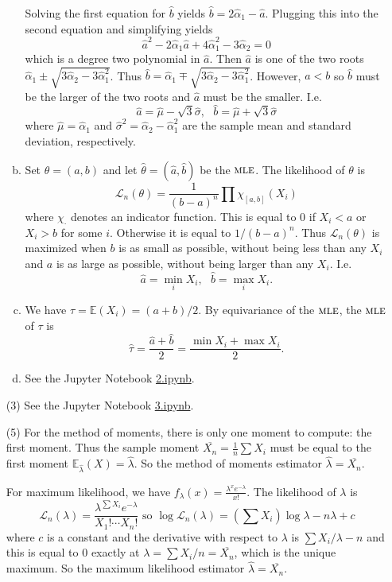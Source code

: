 \documentclass[10pt]{article}
\newcommand{\E}{\mathbb{E}}
\newcommand{\MLE}{\textsc{mle}}
\begin{document}
\begin{enumerate}
\begin{enumerate}[(a)]
Solving the first equation for $\hat b$ yields $\hat b = 2\hat \alpha_1 - \hat a$.
Plugging this into the second equation and simplifying yields
\[
\hat a^2 - 2\hat \alpha_1 \hat a + 4\hat \alpha_1^2 - 3\hat \alpha_2 = 0
\]
which is a degree two polynomial in $\hat a$. Then $\hat a$ is one of the two roots
$\hat \alpha_1 \pm \sqrt{3\hat \alpha_2 - 3 \hat \alpha_1^2}$. Thus
$\hat b = \hat \alpha_1 \mp \sqrt{3\hat \alpha_2 - 3 \hat \alpha_1^2}$. However,
$a<b$ so $\hat b$ must be the larger of the two roots and $\hat a$ must be
the smaller. I.e.
\[
\hat a = \hat \mu - \sqrt{3}\hat \sigma, \ \ \
\hat b = \hat \mu + \sqrt{3}\hat \sigma
\]
where $\hat \mu=\hat \alpha_1$ and $\hat \sigma^2 = \hat \alpha_2 - \hat \alpha_1^2$
are the sample mean and standard deviation, respectively.

\item Set $\theta=(a,b)$ and let $\hat \theta=(\hat a,\hat b)$ be the $\MLE$.
The likelihood of $\theta$ is
\[
\mathcal{L}_n(\theta) = \frac{1}{(b-a)^n}\prod \chi_{[a,b]}(X_i)
\]
where $\chi_\cdot$ denotes an indicator function. This is equal to $0$
if $X_i<a$ or $X_i>b$ for some $i$. Otherwise it is equal to $1/(b-a)^n$.
Thus $\mathcal L_n(\theta)$ is maximized when $b$ is as small as possible, without
being less than any $X_i$ and $a$ is as large as possible, without being larger
than any $X_i$. I.e.
\[
\hat a = \min_i X_i, \ \ \ \hat b = \max_i X_i.
\]
\item We have $\tau = \E(X_i)=(a+b)/2$. By equivariance of the $\MLE$,
the $\MLE$ of $\tau$ is
\[
\hat \tau = \frac{\hat a + \hat b}{2} = \frac{\min X_i + \max X_i}{2}.
\]

\item
See the Jupyter Notebook
\href{https://github.com/ajrasmus/some_of_statistics/blob/main/chapter_9/2.ipynb}{2.ipynb}.
\end{enumerate}

\item[(3)]
See the Jupyter Notebook
\href{https://github.com/ajrasmus/some_of_statistics/blob/main/chapter_9/3.ipynb}{3.ipynb}.

\item[(5)]
For the method of moments, there is only one moment to compute: the first moment.
Thus the sample moment $\overline{X_n}=\frac{1}{n}\sum X_i$ must be equal to
the first moment $\E_{\hat\lambda}(X)=\hat\lambda$. So the method of moments
estimator $\hat\lambda = \overline{X_n}$.

For maximum likelihood, we have $f_{\lambda}(x)=\frac{\lambda^x e^{-\lambda}}{x!}$.
The likelihood of $\lambda$ is
\[
\mathcal L_n(\lambda) =\frac{\lambda^{\sum X_i} e^{-\lambda}}{X_1! \cdots X_n!}
\text{ so }
\log \mathcal L_n(\lambda)= \left(\sum X_i\right)\log \lambda - n\lambda + c
\]
where $c$ is a constant and the derivative with respect to $\lambda$ is
$\sum X_i/\lambda-n$ and this is equal to 0 exactly at
$\lambda=\sum X_i/n = \overline{X_n}$, which is the unique maximum. So
the maximum likelihood estimator $\hat\lambda = \overline{X_n}$.


\end{enumerate}
\end{document}
